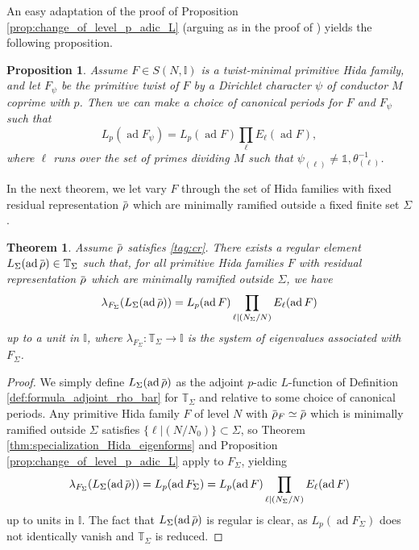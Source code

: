 \documentclass[12pt]{amsart}
\newcommand\bI{\mathbb{I}}
\newcommand\bT{\mathbb{T}}
\newcommand{\ob}[1]{\mkern 1.5mu\overline{\mkern-1.5mu#1\mkern-1.5mu}\mkern 1.5mu}
\DeclareMathOperator{\ad}{ad}
\theoremstyle{defstyle}
\theoremstyle{thmstyle}
\newtheorem{theorem}[subsubsection]{Theorem}
\newtheorem{proposition}[subsubsection]{Proposition}
\begin{document}
An easy adaptation of the proof of Proposition \ref{prop:change_of_level_p_adic_L} (arguing as in the proof of \cite[Lem. 7.4]{hsiehAJM}) yields the following proposition.

\begin{proposition}\label{prop:twists_and_adjoint_p_adic_L}
	Assume $F\in S(N,\bI)$ is a twist-minimal primitive Hida family, and let $F_\psi$ be the primitive twist of $F$ by a Dirichlet character $\psi$ of conductor $M$ coprime with $p$. Then we can make a choice of canonical periods for $F$ and $F_\psi$ such that
	\[L_p(\ad F_\psi)= L_p(\ad F) \prod_\ell E_\ell(\ad F),\]
	where $\ell$ runs over the set of primes dividing $M$ such that $\psi_{(\ell)}\neq\mathds{1},\theta^{-1}_{(\ell)}$.
\end{proposition}

In the next theorem, we let vary $F$ through the set of Hida families with fixed residual representation $\ob{\rho}$ which are minimally ramified outside a fixed finite set $\Sigma$. 

\begin{theorem}\label{thm:main_2}
	Assume $\ob{\rho}$ satisfies \eqref{tag:cr}. There exists a regular element $L_\Sigma(\ad \ob{\rho})\in\bT_\Sigma$ such that, for all primitive Hida families $F$ with residual representation $\ob{\rho}$ which are minimally ramified outside $\Sigma$, we have 
	\[\lambda_{F_\Sigma}(L_\Sigma(\ad\ob{\rho}))=L_p(\ad F)\prod_{\ell|(N_\Sigma/N)}E_\ell(\ad F)\]
	up to a unit in $\bI$, where $\lambda_{F_\Sigma}\colon \bT_\Sigma \to \bI$ is the system of eigenvalues associated with $F_\Sigma$.
\end{theorem}
\begin{proof}
	 We simply define $L_\Sigma(\ad\ob{\rho})$ as the adjoint $p$-adic $L$-function of Definition \ref{def:formula_adjoint_rho_bar} for $\bT_\Sigma$ and relative to some choice of canonical periods. Any primitive Hida family $F$ of level $N$ with $\ob{\rho}_F\simeq \ob{\rho}$ which is minimally ramified outside $\Sigma$ satisfies $\{\ell|(N/N_0)\}\subset \Sigma$, so Theorem \ref{thm:specialization_Hida_eigenforms} and Proposition \ref{prop:change_of_level_p_adic_L} apply to $F_\Sigma$, yielding
	 \[\lambda_{F_\Sigma}(L_\Sigma(\ad\ob{\rho}))=L_p(\ad F_\Sigma)=L_p(\ad F)\prod_{\ell|(N_\Sigma/N)}E_\ell(\ad F)\]
	 up to units in $\bI$. The fact that $L_\Sigma(\ad\ob{\rho})$ is regular is clear, as $L_p(\ad F_\Sigma)$ does not identically vanish and $\bT_\Sigma$ is reduced.
\end{proof}
\end{document}
